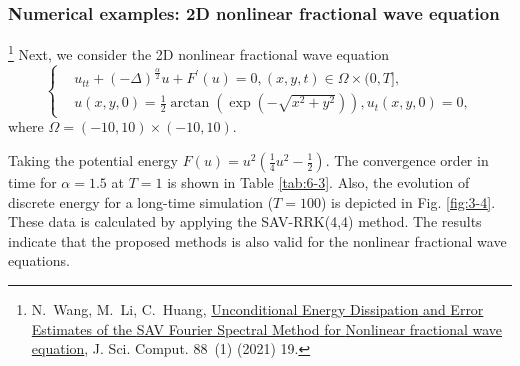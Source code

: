 \documentclass[aspectratio=169]{beamer}
\begin{document}
	\begin{frame}\frametitle{Numerical examples: 2D nonlinear fractional wave equation}
	\begin{example}\label{ex:3}
	  \footnote{\tiny N.~Wang, M.~Li, C.~Huang,
	  \href{https://link.springer.com/10.1007/s10915-021-01534-8}{Unconditional
	  {{Energy Dissipation}} and {{Error Estimates}} of the {{SAV Fourier Spectral
	  Method}} for {{Nonlinear fractional  wave equation}}}, J. Sci.
	  Comput. 88~(1) (2021) 19.} Next, we consider the 2D nonlinear fractional wave equation
	  \begin{equation}
	  \begin{cases}
	  & u_{t t}+(-\Delta)^{\frac{\alpha}{2}} u+F^{\prime}(u)=0,(x, y, t) \in \Omega \times(0, T],\\
	  & u(x, y, 0)=\frac{1}{2} \arctan \left(\exp \left(-\sqrt{x^2+y^2}\right)\right), u_t(x, y, 0)=0,
	  \end{cases}
	  \end{equation}
	  where $\Omega=(-10,10) \times(-10,10)$.
	  \end{example}
	
	Taking the potential energy $F(u)=u^2\left(\frac{1}{4} u^2-\frac{1}{2}\right)$. The convergence order
	  in time for $\alpha=1.5$ at $T=1$ is shown in Table \ref{tab:6-3}.
	  Also, the evolution of discrete energy for a long-time simulation ($T=100$) is depicted in Fig. \ref{fig:3-4}.
	  These data is calculated by applying the SAV-RRK(4,4) method. The results indicate that the proposed methods
	  is also valid for the nonlinear fractional wave equations.
	\end{frame}
	
\end{document}
